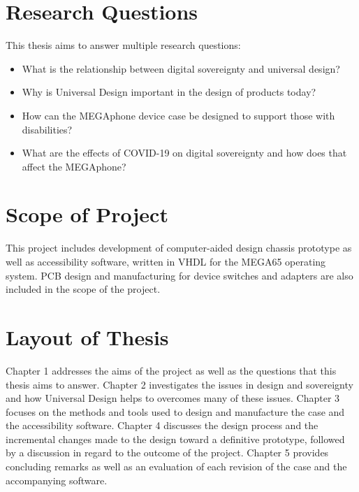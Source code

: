 
\section{Research Questions}

This thesis aims to answer multiple research questions:

\begin{itemize} 
    \item What is the relationship between digital sovereignty and universal design?
    \item Why is Universal Design important in the design of products today?
    \item How can the MEGAphone device case be designed to support those with disabilities?
    \item What are the effects of COVID-19 on digital sovereignty and how does that affect the MEGAphone?
    \end{itemize}


\section{Scope of Project}

This project includes development of computer-aided design chassis prototype as well as accessibility software, written in VHDL for the MEGA65 operating system. 
PCB design and manufacturing for device switches and adapters are also included in the scope of the project.


\section{Layout of Thesis}

Chapter 1 addresses the aims of the project as well as the questions that this thesis aims to answer. 
Chapter 2 investigates the issues in design and sovereignty and how Universal Design helps to overcomes many of these issues. %
Chapter 3 focuses on the methods and tools used to design and manufacture the case and the accessibility software. 
Chapter 4 discusses the design process and the incremental changes made to the design toward a definitive prototype, followed by a discussion in regard to the outcome of the project. 
Chapter 5 provides concluding remarks as well as an evaluation of each revision of the case and the accompanying software.